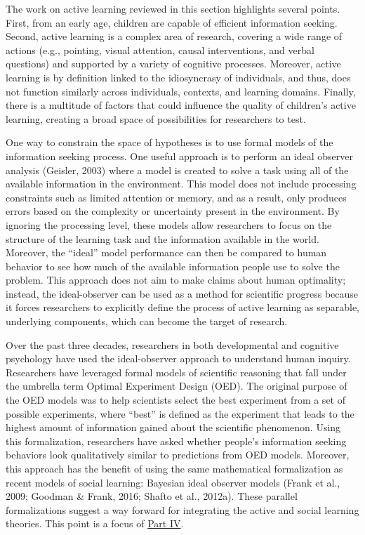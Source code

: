 \documentclass[oneside]{report}
\begin{document}
The work on active learning reviewed in this section highlights several
points. First, from an early age, children are capable of efficient
information seeking. Second, active learning is a complex area of
research, covering a wide range of actions (e.g., pointing, visual
attention, causal interventions, and verbal questions) and supported by
a variety of cognitive processes. Moreover, active learning is by
definition linked to the idiosyncrasy of individuals, and thus, does not
function similarly across individuals, contexts, and learning domains.
Finally, there is a multitude of factors that could influence the
quality of children's active learning, creating a broad space of
possibilities for researchers to test.

One way to constrain the space of hypotheses is to use formal models of
the information seeking process. One useful approach is to perform an
ideal observer analysis (Geisler, 2003) where a model is created to
solve a task using all of the available information in the environment.
This model does not include processing constraints such as limited
attention or memory, and as a result, only produces errors based on the
complexity or uncertainty present in the environment. By ignoring the
processing level, these models allow researchers to focus on the
structure of the learning task and the information available in the
world. Moreover, the ``ideal'' model performance can then be compared to
human behavior to see how much of the available information people use
to solve the problem. This approach does not aim to make claims about
human optimality; instead, the ideal-observer can be used as a method
for scientific progress because it forces researchers to explicitly
define the process of active learning as separable, underlying
components, which can become the target of research.

Over the past three decades, researchers in both developmental and
cognitive psychology have used the ideal-observer approach to understand
human inquiry. Researchers have leveraged formal models of scientific
reasoning that fall under the umbrella term Optimal Experiment Design
(OED). The original purpose of the OED models was to help scientists
select the best experiment from a set of possible experiments, where
``best'' is defined as the experiment that leads to the highest amount
of information gained about the scientific phenomenon. Using this
formalization, researchers have asked whether people's information
seeking behaviors look qualitatively similar to predictions from OED
models. Moreover, this approach has the benefit of using the same
mathematical formalization as recent models of social learning: Bayesian
ideal observer models (Frank et al., 2009; Goodman \& Frank, 2016;
Shafto et al., 2012a). These parallel formalizations suggest a way
forward for integrating the active and social learning theories. This
point is a focus of \protect\hyperlink{p4}{Part IV}.
\end{document}
